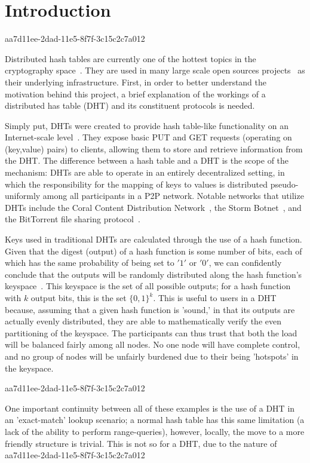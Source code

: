 \documentclass[12pt]{article}
\begin{document}
\section{Introduction}
aa7d11ee-2dad-11e5-8f7f-3c15c2c7a012\par Distributed hash tables are currently one of the hottest topics in the cryptography space~\cite{Stoica:2001dj,Rowstron:2001ea,Ratnasamy:2001wn}. They are used in many large scale open sources projects~\cite{Freitas:2013tb,Xu:2010vs,Perfitt:2010fh} as their underlying infrastructure. First, in order to better understand the motivation behind this project, a brief explanation of the workings of a distributed has table (DHT) and its constituent protocols is needed.

\par Simply put, DHTs were created to provide hash table-like functionality on an Internet-scale level~\cite{Ratnasamy:2001wn}. They expose basic PUT and GET requests (operating on (key,value) pairs) to clients, allowing them to store and retrieve information from the DHT. The difference between a hash table and a DHT is the scope of the mechanism: DHTs are able to operate in an entirely decentralized setting, in which the responsibility for the mapping of keys to values is distributed pseudo-uniformly among all participants in a P2P network. Notable networks that utilize DHTs include the Coral Content Distribution Network~\cite{Freedman:2004vb}, the Storm Botnet~\cite{Holz:2008uk}, and the BitTorrent file sharing protocol~\cite{Cohen:y1_8mBnw}.

\par Keys used in traditional DHTs are calculated through the use of a hash function. Given that the digest (output) of a hash function is some number of bits, each of which has the same probability of being set to $'1'$ or $'0'$, we can confidently conclude that the outputs will be randomly distributed along the hash function's keyspace~. This keyspace is the set of all possible outputs; for a hash function with $k$ output bits, this is the set $\{0,1\}^k$. This is useful to users in a DHT because, assuming that a given hash function is 'sound,' in that its outputs are actually evenly distributed, they are able to mathematically verify the even partitioning of the keyspace. The participants can thus trust that both the load will be balanced fairly among all nodes. No one node will have complete control, and no group of nodes will be unfairly burdened due to their being 'hotspots' in the keyspace.~

aa7d11ee-2dad-11e5-8f7f-3c15c2c7a012\par One important continuity between all of these examples is the use of a DHT in an 'exact-match' lookup scenario; a normal hash table has this same limitation (a lack of the ability to perform range-queries), however, locally, the move to a more friendly structure is trivial. This is not so for a DHT, due to the nature of
\printbibliography
aa7d11ee-2dad-11e5-8f7f-3c15c2c7a012
\end{document}
